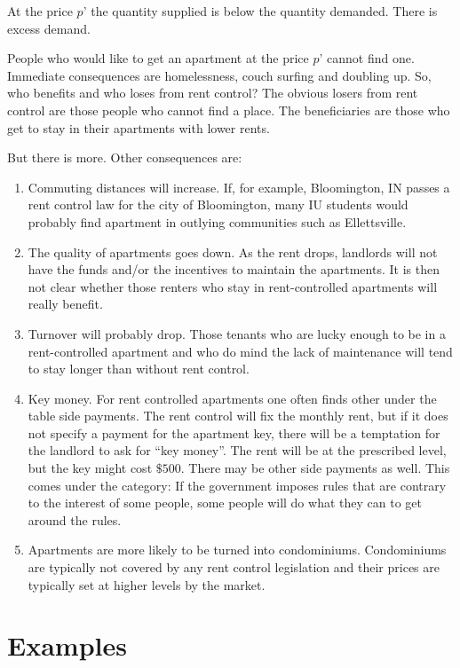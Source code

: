 \documentclass[
]{book}
\begin{document}
At the price \(p’\) the quantity supplied is below the quantity demanded. There is excess demand.

People who would like to get an apartment at the price \(p’\) cannot find one. Immediate consequences are homelessness, couch surfing and doubling up. So, who benefits and who loses from rent control? The obvious losers from rent control are those people who cannot find a place. The beneficiaries are those who get to stay in their apartments with lower rents.

But there is more. Other consequences are:

\begin{enumerate}
\def\labelenumi{\arabic{enumi}.}
\item
  Commuting distances will increase. If, for example, Bloomington, IN passes a rent control law for the city of Bloomington, many IU students would probably find apartment in outlying communities such as Ellettsville.
\item
  The quality of apartments goes down. As the rent drops, landlords will not have the funds and/or the incentives to maintain the apartments. It is then not clear whether those renters who stay in rent-controlled apartments will really benefit.
\item
  Turnover will probably drop. Those tenants who are lucky enough to be in a rent-controlled apartment and who do mind the lack of maintenance will tend to stay longer than without rent control.
\item
  Key money. For rent controlled apartments one often finds other under the table side payments. The rent control will fix the monthly rent, but if it does not specify a payment for the apartment key, there will be a temptation for the landlord to ask for ``key money''. The rent will be at the prescribed level, but the key might cost \(\$500\). There may be other side payments as well. This comes under the category: If the government imposes rules that are contrary to the interest of some people, some people will do what they can to get around the rules.
\item
  Apartments are more likely to be turned into condominiums. Condominiums are typically not covered by any rent control legislation and their prices are typically set at higher levels by the market.
\end{enumerate}

\hypertarget{examples-4}{%
\section{Examples}\label{examples-4}}
\end{document}
